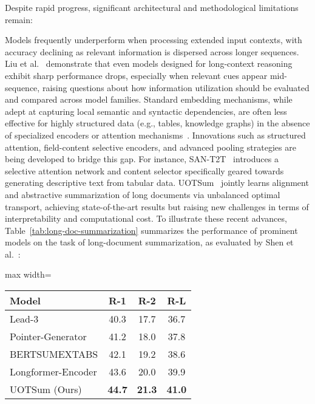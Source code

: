 \documentclass[sigconf]{acmart}
\begin{document}
Despite rapid progress, significant architectural and methodological limitations remain:

Models frequently underperform when processing extended input contexts, with accuracy declining as relevant information is dispersed across longer sequences. Liu et al.~\cite{ref70} demonstrate that even models designed for long-context reasoning exhibit sharp performance drops, especially when relevant cues appear mid-sequence, raising questions about how information utilization should be evaluated and compared across model families.
Standard embedding mechanisms, while adept at capturing local semantic and syntactic dependencies, are often less effective for highly structured data (e.g., tables, knowledge graphs) in the absence of specialized encoders or attention mechanisms~\cite{ref74,ref77,ref100}.
Innovations such as structured attention, field-content selective encoders, and advanced pooling strategies are being developed to bridge this gap. For instance, SAN-T2T~\cite{ref74} introduces a selective attention network and content selector specifically geared towards generating descriptive text from tabular data. UOTSum~\cite{ref75} jointly learns alignment and abstractive summarization of long documents via unbalanced optimal transport, achieving state-of-the-art results but raising new challenges in terms of interpretability and computational cost.
To illustrate these recent advances, Table~\ref{tab:long-doc-summarization} summarizes the performance of prominent models on the task of long-document summarization, as evaluated by Shen et al.~\cite{ref75}:

\begin{table*}[htbp]
\centering
\caption{Performance comparison of representative models on long-document summarization benchmarks~\cite{ref75}. Metrics: R-1 (ROUGE-1), R-2 (ROUGE-2), R-L (ROUGE-L).}
\label{tab:long-doc-summarization}
\begin{adjustbox}{max width=\textwidth}
\begin{tabular}{@{}lccc@{}}
\toprule
Model & R-1 & R-2 & R-L \\
\midrule
Lead-3 & 40.3 & 17.7 & 36.7 \\
Pointer-Generator & 41.2 & 18.0 & 37.8 \\
BERTSUMEXTABS & 42.1 & 19.2 & 38.6 \\
Longformer-Encoder & 43.6 & 20.0 & 39.9 \\
UOTSum (Ours) & \textbf{44.7} & \textbf{21.3} & \textbf{41.0} \\
\bottomrule
\end{tabular}
\end{adjustbox}
\end{table*}
\end{document}
